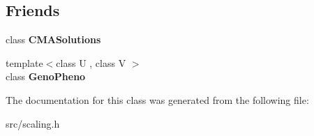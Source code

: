 \subsection*{Friends}
\begin{DoxyCompactItemize}
\item 
\hypertarget{classlibcmaes_1_1linScalingStrategy_a78b1b9910ebce544de9b54b998e77879}{class {\bfseries C\-M\-A\-Solutions}}\label{classlibcmaes_1_1linScalingStrategy_a78b1b9910ebce544de9b54b998e77879}

\item 
\hypertarget{classlibcmaes_1_1linScalingStrategy_a30b6df18a1c8899440f1ca1273b26bb9}{{\footnotesize template$<$class U , class V $>$ }\\class {\bfseries Geno\-Pheno}}\label{classlibcmaes_1_1linScalingStrategy_a30b6df18a1c8899440f1ca1273b26bb9}

\end{DoxyCompactItemize}


The documentation for this class was generated from the following file\-:\begin{DoxyCompactItemize}
\item 
src/scaling.\-h\end{DoxyCompactItemize}
